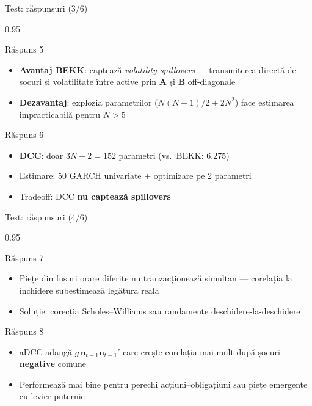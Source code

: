 \documentclass[9pt, aspectratio=169, t]{beamer}
\begin{document}
\begin{frame}{Test: răspunsuri (3/6)}
    \begin{cminipage}{0.95\textwidth}
    {\scriptsize
    \begin{exampleblock}{Răspuns 5}
        \begin{itemize}\setlength{\itemsep}{0pt}
            \item \textbf{Avantaj BEKK}: captează \textit{volatility spillovers} --- transmiterea directă de șocuri și volatilitate între active prin $\mathbf{A}$ și $\mathbf{B}$ off-diagonale
            \item \textbf{Dezavantaj}: explozia parametrilor ($N(N+1)/2 + 2N^2$) face estimarea impracticabilă pentru $N > 5$
        \end{itemize}
    \end{exampleblock}
    \begin{exampleblock}{Răspuns 6}
        \begin{itemize}\setlength{\itemsep}{0pt}
            \item \textbf{DCC}: doar $3N + 2 = 152$ parametri (vs.\ BEKK: 6.275)
            \item Estimare: 50 GARCH univariate + optimizare pe 2 parametri
            \item Tradeoff: DCC \textbf{nu captează spillovers}
        \end{itemize}
    \end{exampleblock}
    }
    \end{cminipage}
\end{frame}

\begin{frame}{Test: răspunsuri (4/6)}
    \begin{cminipage}{0.95\textwidth}
    {\scriptsize
    \begin{exampleblock}{Răspuns 7}
        \begin{itemize}\setlength{\itemsep}{0pt}
            \item Piețe din fusuri orare diferite nu tranzacționează simultan --- corelația la închidere subestimează legătura reală
            \item Soluție: corecția Scholes--Williams sau randamente deschidere-la-deschidere
        \end{itemize}
    \end{exampleblock}
    \begin{exampleblock}{Răspuns 8}
        \begin{itemize}\setlength{\itemsep}{0pt}
            \item aDCC adaugă $g\,\mathbf{n}_{t-1}\mathbf{n}_{t-1}'$ care crește corelația mai mult după șocuri \textbf{negative} comune
            \item Performează mai bine pentru perechi acțiuni--obligațiuni sau piețe emergente cu levier puternic
        \end{itemize}
    \end{exampleblock}
    }
    \end{cminipage}
\end{frame}
\end{document}
